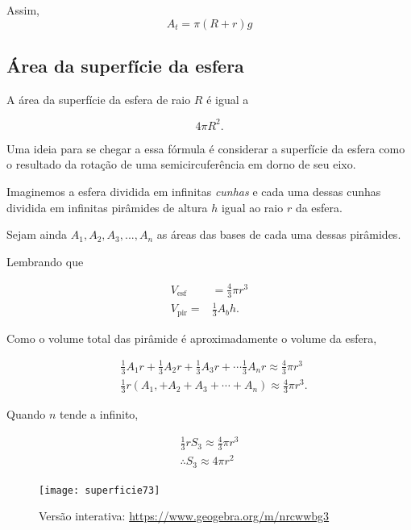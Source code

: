 
Assim,
\begin{equation*}
A_t=\pi(R+r)g
\end{equation*}

\subsection{ Área da superfície da esfera}

A área da superfície da esfera de raio $R$ é igual a 

\begin{equation*}
4\pi R^2.
\end{equation*}

Uma ideia para se chegar a essa fórmula é considerar a superfície da esfera como o resultado da rotação de uma semicircuferência em dorno de seu eixo.

Imaginemos a esfera dividida em infinitas \textit{cunhas} e cada uma dessas cunhas dividida em infinitas pirâmides de altura $h$ igual ao raio $r$ da esfera.

Sejam ainda $A_1,A_2,A_3,...,A_n$ as áreas das bases de cada uma dessas pirâmides.

Lembrando que

\begin{align*}
V_{\text{esf}}&=\frac{4}{3}\pi r^3\\
V_{\text{pir}}=&\frac{1}{3}A_bh.
\end{align*}

Como o volume total das pirâmide é aproximadamente o volume da esfera,

\begin{align*}
&\frac{1}{3}A_1 r+\frac{1}{3}A_2 r+\frac{1}{3}A_3r+\cdots\frac{1}{3}A_n r \approx\frac{4}{3}\pi r^3\\
&\frac{1}{3}r(A_1,+A_2+A_3+\cdots+A_n)\approx\frac{4}{3}\pi r^3.
\end{align*}

Quando $n$ tende a infinito,

\begin{align*}
\frac{1}{3}rS_3\approx\frac{4}{3}\pi r^3\\
\therefore S_3\approx4\pi r^2
\end{align*}
\begin{figure}[H]
\centering

\texttt{[image: superficie73]}

\caption{Versão interativa: \url{https://www.geogebra.org/m/nrcwwbg3}}
\end{figure}



